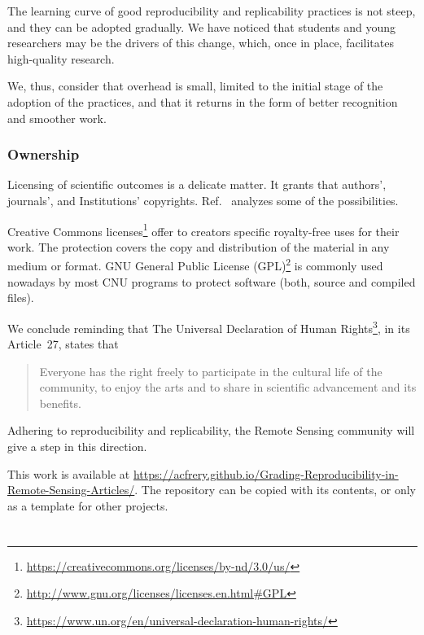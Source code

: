 \documentclass[journal,twoside]{IEEEtran}
\providecommand{\DIFadd}[1]{{\protect\color{blue}\uwave{#1}}} %
\providecommand{\DIFaddbegin}{} %
\newcommand{\DIFaddincludegraphics}[2][]{{\color{blue}\fbox{\DIFOincludegraphics[#1]{#2}}}} %
\DeclareRobustCommand{\DIFaddbegin}{\DIFOaddbegin \let\includegraphics\DIFaddincludegraphics} %
\begin{document}
The learning curve of good reproducibility and replicability practices is not steep, and they can be adopted gradually.
We have noticed that students and young researchers may be the drivers of this change, which, once in place, facilitates high-quality research.

We, thus, consider that overhead is small, limited to the initial stage of the adoption of the practices, and that it returns in the form of better recognition and smoother work.

\subsubsection{Ownership}\label{Sec:Ownership}

Licensing of scientific outcomes is a delicate matter.
It grants that authors', journals', and Institutions' copyrights.
Ref.~\cite{TheLegalFrameworkforReproducibleScientificResearchLicensingandCopyright} analyzes some of the possibilities.  

Creative Commons licenses\footnote{\url{https://creativecommons.org/licenses/by-nd/3.0/us/}} offer to creators specific royalty-free uses for their work. 
The protection covers the copy and distribution of the material in any medium or format. 
GNU General Public License (GPL)\footnote{\url{http://www.gnu.org/licenses/licenses.en.html#GPL}} is commonly used nowadays by most CNU programs to protect software (both, source and compiled files). 

We conclude reminding that The Universal Declaration of Human Rights\footnote{\url{https://www.un.org/en/universal-declaration-human-rights/}}, in its Article~27, states that
\begin{quote}
	Everyone has the right freely to participate in the cultural life of the community, to enjoy the arts and to share in scientific advancement and its benefits.
\end{quote}
Adhering to reproducibility and replicability, the Remote Sensing community will give a step in this direction.

This work is available at \url{https://acfrery.github.io/Grading-Reproducibility-in-Remote-Sensing-Articles/}.
The repository can be copied with its contents, or only as a template for other projects.

\DIFaddbegin \section*{\DIFadd{Disclaimer and non-affiliation}}
\end{document}
